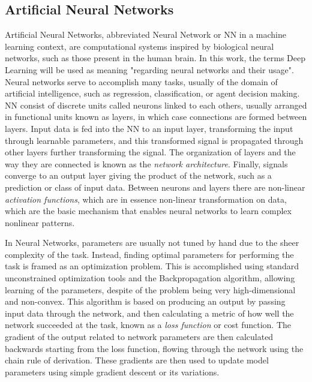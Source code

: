 \subsection{Artificial Neural Networks}

Artificial Neural Networks, abbreviated Neural Network or NN in a machine learning context, are computational systems inspired by biological neural networks, such as those present in the human brain. In this work, the terms Deep Learning will be used as meaning "regarding neural networks and their usage". Neural networks serve to accomplish many tasks, usually of the domain of artificial intelligence, such as regression, classification, or agent decision making. NN consist of discrete units called neurons linked to each others, usually arranged in functional units known as layers, in which case connections are formed between layers. Input data is fed into the NN to an input layer, transforming the input through learnable parameters, and this transformed signal is propagated through other layers further transforming the signal. The organization of layers and the way they are connected is known as the \textit{network architecture}. Finally, signals converge to an output layer giving the product of the network, such as a prediction or class of input data. Between neurons and layers there are non-linear \textit{activation functions}, which are in essence non-linear transformation on data, which are the basic mechanism that enables neural networks to learn complex nonlinear patterns.

In Neural Networks, parameters are usually not tuned by hand due to the sheer complexity of the task. Instead, finding optimal parameters for performing the task is framed as an optimization problem. This is accomplished using standard unconstrained optimization tools and the Backpropagation algorithm, allowing learning of the parameters, despite of the problem being very high-dimensional and non-convex. This algorithm is based on producing an output by passing input data through the network, and then calculating a metric of how well the network succeeded at the task, known as a \textit{loss function} or cost function. The gradient of the output related to network parameters are then calculated backwards starting from the loss function, flowing through the network using the chain rule of derivation. These gradients are then used to update model parameters using simple gradient descent or its variations. 

